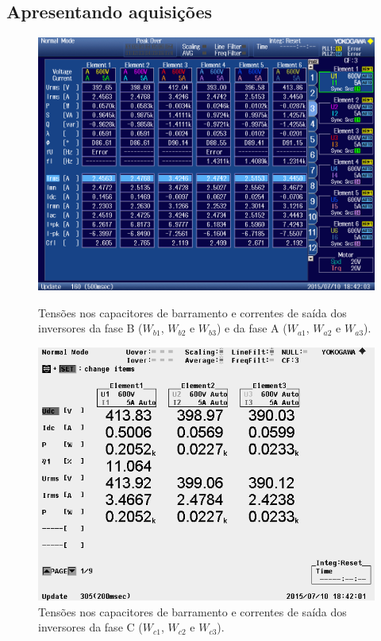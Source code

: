 \documentclass[
	article,			%
	12pt,				%
	twoside,			%
	a4paper,			%
	english,			%
	brazil,				%
	sumario=tradicional
	]{abntex2-modelo-notas-de-aula}
\begin{document}
\subsection{Apresentando aquisições}


\begin{figure}[!h]
	\centering
	\begin{minipage}[t]{0.45\textwidth}	\centering
		\includegraphics[width=1\linewidth]{aqs/0002}
		\caption{Tensões nos capacitores de barramento e correntes de saída dos inversores da fase B ($W_{b1}$, $W_{b2}$ e $W_{b3}$) e da fase A ($W_{a1}$, $W_{a2}$ e $W_{a3}$).}
		\label{fig:0002}
	\end{minipage}
	\quad
	\begin{minipage}[t]{0.45\textwidth} \centering
		\includegraphics[width=1\linewidth]{aqs/TTZVSPWM0015}
		\caption{Tensões nos capacitores de barramento e correntes de saída dos inversores da fase C ($W_{c1}$, $W_{c2}$ e $W_{c3}$).}
		\label{fig:TTZVSPWM0015}
	\end{minipage}	
\end{figure}
\end{document}
